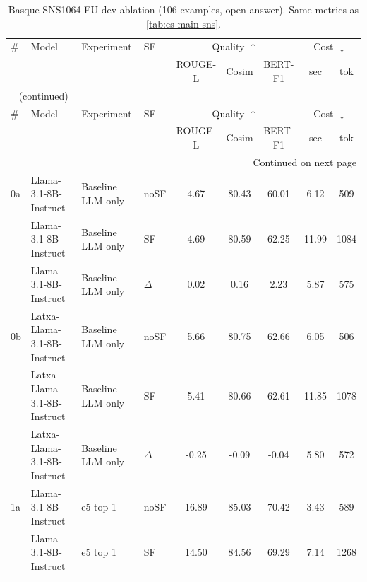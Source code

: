 \begin{scriptsize}
\setlength{\tabcolsep}{3pt}
\setlength{\LTcapwidth}{\linewidth}
\begin{longtable}{l l l l c c c c c}
\caption[Basque SNS-1064 dev ablation]{Basque SNS1064 EU dev ablation (106 examples, open-answer). Same metrics as \autoref{tab:es-main-sns}.} \label{tab:eu-main-sns} \\
\toprule
\# & Model & Experiment & SF & \multicolumn{3}{c}{Quality $\uparrow$} & \multicolumn{2}{c}{Cost $\downarrow$} \\
\cmidrule(lr){5-7}\cmidrule(lr){8-9}
\multicolumn{1}{l}{} & \multicolumn{1}{l}{} & \multicolumn{1}{l}{} & \multicolumn{1}{l}{} & \multicolumn{1}{c}{ROUGE-L} & \multicolumn{1}{c}{Cosim} & \multicolumn{1}{c}{BERT-F1} & \multicolumn{1}{c}{sec} & \multicolumn{1}{c}{tok} \\
\midrule
\endfirsthead
\multicolumn{9}{l}{\tablename\ \thetable{} (continued)} \\
\toprule
\# & Model & Experiment & SF & \multicolumn{3}{c}{Quality $\uparrow$} & \multicolumn{2}{c}{Cost $\downarrow$} \\
\cmidrule(lr){5-7}\cmidrule(lr){8-9}
\multicolumn{1}{l}{} & \multicolumn{1}{l}{} & \multicolumn{1}{l}{} & \multicolumn{1}{l}{} & \multicolumn{1}{c}{ROUGE-L} & \multicolumn{1}{c}{Cosim} & \multicolumn{1}{c}{BERT-F1} & \multicolumn{1}{c}{sec} & \multicolumn{1}{c}{tok} \\
\midrule
\endhead
\midrule
\multicolumn{9}{r}{Continued on next page} \\
\endfoot
\bottomrule
\endlastfoot
0a & Llama-3.1-8B-Instruct & Baseline LLM only & noSF & 4.67 & 80.43 & 60.01 & 6.12 & 509 \\
 & Llama-3.1-8B-Instruct & Baseline LLM only & SF & 4.69 & 80.59 & 62.25 & 11.99 & 1084 \\
 & Llama-3.1-8B-Instruct & Baseline LLM only & $\Delta$ & 0.02 & 0.16 & 2.23 & 5.87 & 575 \\
0b & Latxa-Llama-3.1-8B-Instruct & Baseline LLM only & noSF & 5.66 & 80.75 & 62.66 & 6.05 & 506 \\
 & Latxa-Llama-3.1-8B-Instruct & Baseline LLM only & SF & 5.41 & 80.66 & 62.61 & 11.85 & 1078 \\
 & Latxa-Llama-3.1-8B-Instruct & Baseline LLM only & $\Delta$ & -0.25 & -0.09 & -0.04 & 5.80 & 572 \\
\dmidrule
1a & Llama-3.1-8B-Instruct & e5 top 1 & noSF & 16.89 & 85.03 & 70.42 & 3.43 & 589 \\
 & Llama-3.1-8B-Instruct & e5 top 1 & SF & 14.50 & 84.56 & 69.29 & 7.14 & 1268 \\

\end{longtable}
\end{scriptsize}
